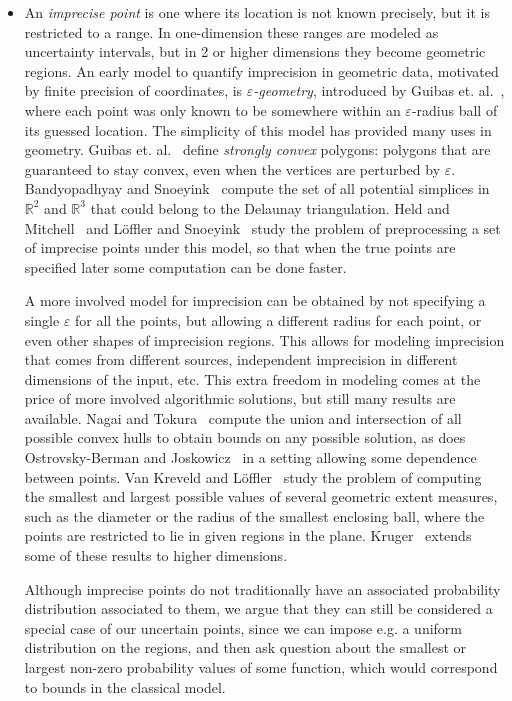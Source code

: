 \documentclass{journal}
\newcommand{\eps}{\varepsilon}
\renewcommand{\b}[1]{\ensuremath{\mathbb{#1}}}
\newcommand{\etal}{et. al.}
\begin{document}
\begin{itemize}
\item 
An \emph{imprecise point} is one where its location is not known precisely, but it is restricted to a range.  In one-dimension these ranges are modeled as uncertainty intervals, but in 2 or higher dimensions they become geometric regions. 
An early model to quantify imprecision in geometric data, motivated by finite precision of coordinates, is {\it $\eps$-geometry}, introduced by Guibas \etal~\cite {gss-egbra-89}, where each point was only known to be somewhere within an $\eps$-radius ball of its guessed location. 
The simplicity of this model has provided many uses in geometry.
Guibas \etal~\cite {gss-cscah-93} define \emph {strongly convex} polygons: polygons that are guaranteed to stay convex, even when the vertices are perturbed by $\eps$. 
Bandyopadhyay and Snoeyink~\cite{bs-ads-04} compute the set of all potential simplices in $\b R^2$ and $\b R^3$ that could belong to the Delaunay triangulation.
Held and Mitchell~\cite {hm-ticpps-08} and L\"offler and Snoeyink~\cite {ls-dtip-08} study the problem of preprocessing a set of imprecise points under this model, so that when the true points are specified later some computation can be done faster.

A more involved model for imprecision can be obtained by not specifying a single $\eps$ for all the points, but allowing a different radius for each point, or even other shapes of imprecision regions. This allows for modeling imprecision that comes from different sources, independent imprecision in different dimensions of the input, etc. This extra freedom in modeling comes at the price of more involved algorithmic solutions, but still many results are available.
Nagai and Tokura~\cite {nt-teb-00} compute the union and intersection of all possible convex hulls to obtain bounds on any possible solution, as does Ostrovsky-Berman and Joskowicz~\cite {obj-ue-05} in a setting allowing some dependence between points.
Van Kreveld and L\"offler~\cite {kl-bgmips-06} study the problem of computing the smallest and largest possible values of several geometric extent measures, such as the diameter or the radius of the smallest enclosing ball, where the points are restricted to lie in given regions in the plane.
Kruger~\cite {k-bmips-08} extends some of these results to higher dimensions.

Although imprecise points do not traditionally have an associated probability distribution associated to them, we argue that they can still be considered a special case of our uncertain points, since we can impose e.g. a uniform distribution on the regions, and then ask question about the smallest or largest non-zero probability values of some function, which would correspond to bounds in the classical model.




\end{itemize}
\end{document}

